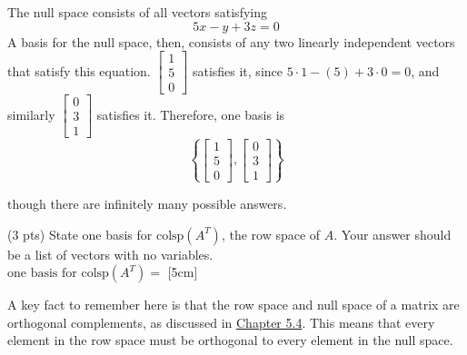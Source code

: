 \documentclass[11pt]{article}
\begin{document}
\begin{prob}[(16 pts)]
\begin{subprob}
\begin{solution}
The null space consists of all vectors satisfying
\[
5x-y+3z = 0
\]
A basis for the null space, then, consists of any two linearly independent vectors that satisfy this equation. $\begin{bmatrix} 1 \\ 5 \\ 0 \end{bmatrix}$ satisfies it, since $5 \cdot 1 - (5) + 3 \cdot 0 = 0$, and similarly $\begin{bmatrix} 0 \\ 3 \\ 1 \end{bmatrix}$ satisfies it. Therefore, one basis is
\[
\left\{ \begin{bmatrix} 1 \\ 5 \\ 0 \end{bmatrix}, \begin{bmatrix} 0 \\ 3 \\ 1 \end{bmatrix} \right\}
\]
\end{solution}

though there are infinitely many possible answers.
\end{subprob}

\begin{subprob}(3 pts)
State one basis for $\text{colsp}(A^T)$, the row space of $A$. Your answer should be a list of vectors with no variables. \\

$\text{one basis for }\text{colsp}(A^T) = $ [5cm]

\begin{solution}
A key fact to remember here is that the row space and null space of a matrix are orthogonal complements, as discussed in \href{https://notes.eecs245.org/matrices/null-space-rank-nullity/\#example-orthogonal-complements}{Chapter 5.4}. This means that every element in the row space must be orthogonal to every element in the null space. \\


\end{solution}
\end{subprob}
\end{prob}
\end{document}

